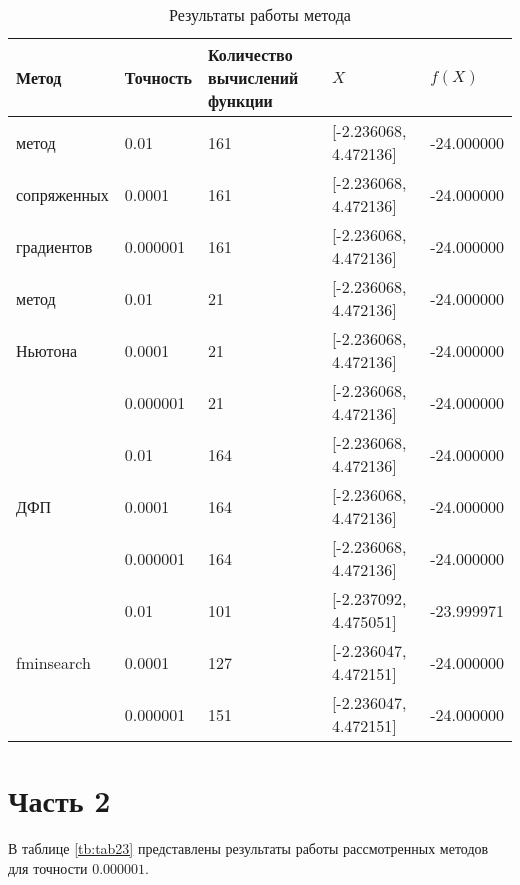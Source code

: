 \begin{table}[!ht]
\caption{Результаты работы метода}
\begin{tabular}{|p{}|p{}|p{}|p{}|p{}|}
\hline
Метод & Точность& Количество вычислений функции & $X$ & $f(X)$\\
\hline
метод & 0.01 & 161 & [-2.236068, 4.472136] & -24.000000 \\
сопряженных & 0.0001 & 161 & [-2.236068, 4.472136] & -24.000000\\
градиентов & 0.000001 & 161 & [-2.236068, 4.472136]  & -24.000000 \\
\hline
метод & 0.01 & 21 & [-2.236068, 4.472136] & -24.000000 \\
Ньютона & 0.0001 & 21 & [-2.236068, 4.472136] & -24.000000\\
 & 0.000001 & 21 & [-2.236068, 4.472136] & -24.000000\\
\hline
& 0.01 & 164 & [-2.236068, 4.472136] & -24.000000\\
ДФП& 0.0001 & 164 & [-2.236068, 4.472136] & -24.000000\\
& 0.000001 & 164 & [-2.236068, 4.472136] & -24.000000\\
\hline
& 0.01 & 101 & [-2.237092, 4.475051] & -23.999971 \\
fminsearch& 0.0001 & 127 & [-2.236047, 4.472151] & -24.000000\\
& 0.000001 & 151 & [-2.236047, 4.472151] & -24.000000 \\
\hline
\end{tabular}
\label{tb:tab1}
\end{table}

\section{Часть 2}

В таблице \ref{tb:tab23} представлены результаты работы рассмотренных методов для точности $0.000001$.

